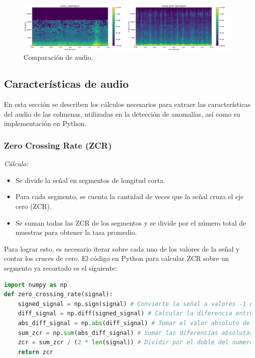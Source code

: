 ﻿\begin{figure}[!ht]
    \centering
    \includegraphics[width=\textwidth]{assets/cap_3/comparacion_audio.png}
    \caption{Comparación de audio.}
    \label{fig:comparacion_audio}
\end{figure}

\subsection{Características de audio}
En esta sección se describen los cálculos necesarios para extraer las características del audio de las colmenas, utilizadas en la detección de anomalías, así como su implementación en Python.

\subsubsection{Zero Crossing Rate (ZCR)}
\textit{Cálculo:}
\begin{itemize}
    \item Se divide la señal en segmentos de longitud corta.
    \item Para cada segmento, se cuenta la cantidad de veces que la señal cruza el eje cero (ZCR).
    \item Se suman todas las ZCR de los segmentos y se divide por el número total de muestras para obtener la tasa promedio.
\end{itemize}
Para lograr esto, es necesario iterar sobre cada uno de los valores de la señal y contar los cruces de cero. El código en Python para calcular ZCR sobre un segmento ya recortado es el siguiente:
\begin{lstlisting}[language=Python, label={lst:zcr_code}, caption={Cálculo de Zero Crossing Rate (ZCR) en Python}]
import numpy as np
def zero_crossing_rate(signal):
    signed_signal = np.sign(signal) # Convierte la señal a valores -1 o 1 basandose en el signo de cada muestra, -1 si la muestra es negativa, 1 si es positiva Ej: [-1, 1, -1, 1, 1]
    diff_signal = np.diff(signed_signal) # Calcular la diferencia entre muestras consecutivas Ej: [2, -2, 2, 0]
    abs_diff_signal = np.abs(diff_signal) # Tomar el valor absoluto de las diferencias Ej: [2, 2, 2, 0]
    sum_zcr = np.sum(abs_diff_signal) # Sumar las diferencias absolutas Ej: 2 + 2 + 2 + 0 = 6
    zcr = sum_zcr / (2 * len(signal)) # Dividir por el doble del numero de muestras para obtener la tasa promedio, se multiplica por 2 porque se considera la diferencia entre 1 y -1 (2) como un cruce de 0, Ej: 6 / (2 * 5) = 0.6
    return zcr
\end{lstlisting}

